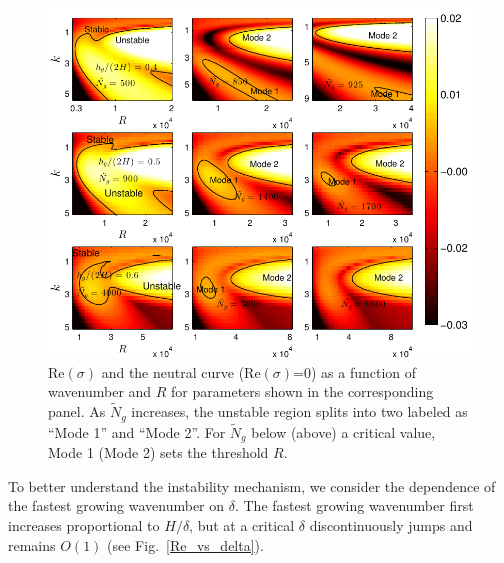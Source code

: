\documentclass[12pt]{report}   %
\newcommand{\Rey}{{R}}
\newcommand{\Ndg}{\tilde{N}_g}
\begin{document}
\begin{figure}
 \includegraphics[width=\textwidth]{SetAll_imgsc3}

\caption{
$\text{Re}(\sigma)$ and the neutral curve ($\text{Re}(\sigma)$=0) as a function of wavenumber and $\Rey$ for parameters shown in the corresponding panel.  
As $\Ndg$ increases, the unstable region splits into two labeled as ``Mode 1'' and ``Mode 2''. 
For $\Ndg$ below (above) a critical value, Mode 1 (Mode 2) sets the threshold $\Rey$.
}
\label{K_Re_sigma_set3}
\end{figure}
To better understand the instability mechanism, we consider the dependence of the fastest growing wavenumber on $\delta$.
The fastest growing wavenumber first increases proportional to $H/\delta$, but at a critical $\delta$ discontinuously jumps and remains $O(1)$ (see Fig.~\ref{Re_vs_delta}). 
\end{document}
